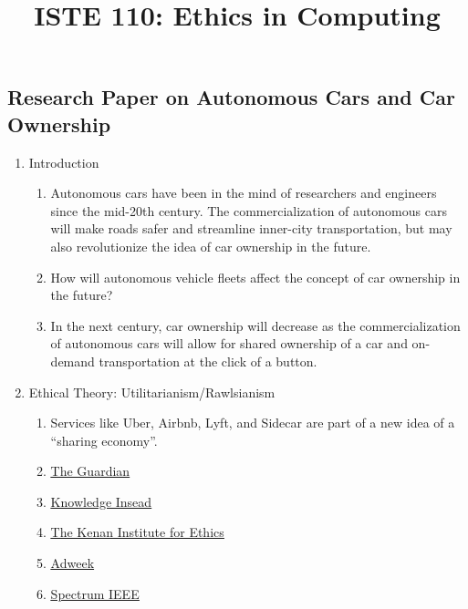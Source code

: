 \documentclass{article}
\title{ISTE 110: Ethics in Computing}
\date{}
\begin{document}
\maketitle

\subsection*{Research Paper on Autonomous Cars and Car Ownership}
\begin{enumerate}
  \item Introduction
  \begin{enumerate}
    \item Autonomous cars have been in the mind of researchers and engineers
      since the mid-20th century. The commercialization of autonomous cars will
      make roads safer and streamline inner-city transportation, but may also
      revolutionize the idea of car ownership in the future.
    \item How will autonomous vehicle fleets affect the concept of car ownership
      in the future?
    \item In the next century, car ownership will decrease as the
      commercialization of autonomous cars will allow for shared ownership of
      a car and on-demand transportation at the click of a button.
  \end{enumerate}
  \item Ethical Theory: Utilitarianism/Rawlsianism
  \begin{enumerate}
    \item Services like Uber, Airbnb, Lyft, and Sidecar are part of a new idea
      of a ``sharing economy''.
    \item \href{https://www.theguardian.com/technology/2016/oct/17/sharing-economy-capitalism-uber-airbnb-ownership}{\underline{The Guardian}}
    \item \href{http://knowledge.insead.edu/responsibility/whos-responsible-the-ethics-of-the-sharing-economy-5034}{\underline{Knowledge Insead}}
    \item \href{https://kenan.ethics.duke.edu/wp-content/uploads/2012/08/Sharing-EconomyTN2015.pdf}{\underline{The Kenan Institute for Ethics}}
    \item \href{http://www.adweek.com/digital/sharing-economy-steeped-ethical-controversy/}{\underline{Adweek}}
    \item \href{http://spectrum.ieee.org/cars-that-think/transportation/self-driving/people-want-driverless-cars-with-utilitarian-ethics-unless-theyre-a-passenger}{\underline{Spectrum IEEE}}

\end{enumerate}
\end{enumerate}
\end{document}
